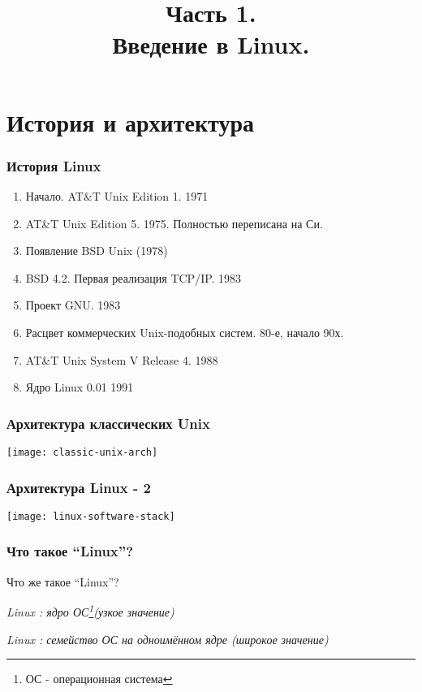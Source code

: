 

\title[SaM Solutions. Linux QA Training]
{
  Часть 1.\\
  Введение в Linux.
}



\firstframe

\section{История и архитектура}

\begin{frame}
  \frametitle{История Linux}

  \begin{enumerate}
    \item Начало. AT\&T Unix Edition 1. 1971
    \item AT\&T Unix Edition 5. 1975. Полностью переписана на Си. 
    \item Появление BSD Unix (1978)
    \item BSD 4.2. Первая реализация TCP/IP. 1983
    \item Проект GNU. 1983 
    \item Расцвет коммерческих Unix-подобных систем. 80-е, начало 90х.
    \item AT\&T Unix System V Release 4. 1988
    \item Ядро Linux 0.01 1991 
  \end{enumerate}

\end{frame}

\begin{frame}
  \frametitle{Архитектура классических Unix}
    \texttt{[image: classic-unix-arch]}
\end{frame}


\begin{frame}
  \frametitle{Архитектура Linux - 2}

  \begin{center}
    \texttt{[image: linux-software-stack]}
  \end{center}

\end{frame}

\begin{frame}
  \frametitle{Что такое ``Linux''?}
  \begin{center}
    \alert{Что же такое ``Linux''?}
  \end{center}

  \pause 

  \emph{Linux : ядро ОС\footnote{ОС - операционная система}(узкое значение)}
  \newline
  \pause

  \emph{Linux : семейство ОС на одноимённом ядре (широкое значение)}

\end{frame}

